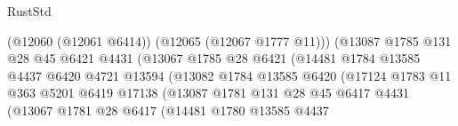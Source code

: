 \begin{lexlean}{RustStd}
\begin{coremodule}
                                            (@12060 (@12061 @6414))
                                            (@12065 (@12067 @1777 @11)))
                                          (@13087
                                            @1785
                                            @131
                                            @28
                                            @45
                                            @6421
                                            @4431
                                            (@13067
                                              @1785
                                              @28
                                              @6421
                                              (@14481
                                                @1784
                                                @13585
                                                @4437
                                                @6420
                                                @4721
                                                @13594
                                                (@13082
                                                  @1784
                                                  @13585
                                                  @6420
                                                  (@17124
                                                    @1783
                                                    @11
                                                    @363
                                                    @5201
                                                    @6419
                                                    @17138
                                                    (@13087
                                                      @1781
                                                      @131
                                                      @28
                                                      @45
                                                      @6417
                                                      @4431
                                                      (@13067
                                                        @1781
                                                        @28
                                                        @6417
                                                        (@14481
                                                          @1780
                                                          @13585
                                                          @4437

\end{coremodule}
\end{lexlean}
